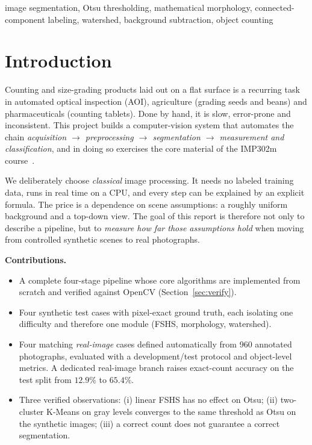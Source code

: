 \documentclass[conference,a4paper]{IEEEtran}
\begin{document}
\begin{IEEEkeywords}
image segmentation, Otsu thresholding, mathematical morphology, connected-component labeling, watershed, background subtraction, object counting
\end{IEEEkeywords}

\section{Introduction}
Counting and size-grading products laid out on a flat surface is a recurring task in automated optical inspection (AOI), agriculture (grading seeds and beans) and pharmaceuticals (counting tablets). Done by hand, it is slow, error-prone and inconsistent. This project builds a computer-vision system that automates the chain \emph{acquisition $\rightarrow$ preprocessing $\rightarrow$ segmentation $\rightarrow$ measurement and classification}, and in doing so exercises the core material of the IMP302m course~\cite{bovik2005handbook,gonzalez2018dip}.

We deliberately choose \emph{classical} image processing. It needs no labeled training data, runs in real time on a CPU, and every step can be explained by an explicit formula. The price is a dependence on scene assumptions: a roughly uniform background and a top-down view. The goal of this report is therefore not only to describe a pipeline, but to \emph{measure how far those assumptions hold} when moving from controlled synthetic scenes to real photographs.

\textbf{Contributions.}
\begin{itemize}
\item A complete four-stage pipeline whose core algorithms are implemented from scratch and verified against OpenCV (Section~\ref{sec:verify}).
\item Four synthetic test cases with pixel-exact ground truth, each isolating one difficulty and therefore one module (FSHS, morphology, watershed).
\item Four matching \emph{real-image} cases defined automatically from 960 annotated photographs, evaluated with a development/test protocol and object-level metrics. A dedicated real-image branch raises exact-count accuracy on the test split from $12.9\%$ to $65.4\%$.
\item Three verified observations: (i) linear FSHS has no effect on Otsu; (ii) two-cluster K-Means on gray levels converges to the same threshold as Otsu on the synthetic images; (iii) a correct count does not guarantee a correct segmentation.
\end{itemize}
\end{document}
